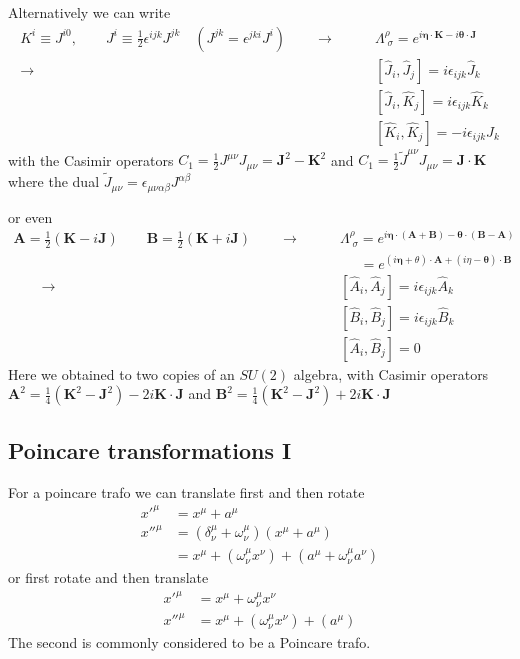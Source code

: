 \documentclass[10pt,a4paper]{report}
\theoremstyle{definition}
\begin{document}
Alternatively we can write
\begin{align}
K^i\equiv J^{i0},
\qquad 
J^i\equiv\frac{1}{2}\epsilon^{ijk}J^{jk}\quad(J^{jk}=\epsilon^{jki}J^i)\qquad\rightarrow\qquad&\Lambda^\rho_{\;\sigma}
=e^{i\mathbf{\eta}\cdot\mathbf{K}-i\mathbf{\theta}\cdot\mathbf{J}}\\
\rightarrow\qquad
&[\hat{J}_i,\hat{J}_j]=i\epsilon_{ijk}\hat{J}_k\\
&[\hat{J}_i,\hat{K}_j]=i\epsilon_{ijk}\hat{K}_k\\
&[\hat{K}_i,\hat{K}_j]=-i\epsilon_{ijk}\hat{J}_k
\end{align}
with the Casimir operators $C_1=\frac{1}{2}J^{\mu\nu}J_{\mu\nu}=\mathbf{J}^2-\mathbf{K}^2$ and $C_1=\frac{1}{2}\tilde{J}^{\mu\nu}J_{\mu\nu}=\mathbf{J}\cdot\mathbf{K}$
where the dual $\tilde{J}_{\mu\nu}=\epsilon_{\mu\nu\alpha\beta}J^{\alpha\beta}$



or even
\begin{align}
\mathbf{A}=\frac{1}{2}(\mathbf{K}-i\mathbf{J})
\qquad
\mathbf{B}=\frac{1}{2}(\mathbf{K}+i\mathbf{J})
\qquad\rightarrow\qquad
&\Lambda^\rho_{\;\sigma}
=e^{i\mathbf{\eta}\cdot(\mathbf{A+B})-\mathbf{\theta}\cdot(\mathbf{B}-\mathbf{A})}\\
&\;\;\;\;\;
=e^{(i\mathbf{\eta}+\theta)\cdot\mathbf{A}+(i\eta-\mathbf{\theta})\cdot\mathbf{B}}\\
\qquad\rightarrow\qquad
&[\hat{A}_i,\hat{A}_j]=i\epsilon_{ijk}\hat{A}_k\\
&[\hat{B}_i,\hat{B}_j]=i\epsilon_{ijk}\hat{B}_k\\
&[\hat{A}_i,\hat{B}_j]=0
\end{align}
Here we obtained to two copies of an $SU(2)$ algebra, with Casimir operators $\mathbf{A}^2=\frac{1}{4}(\mathbf{K}^2-\mathbf{J}^2)-2i\mathbf{K\cdot J}$ and $\mathbf{B}^2=\frac{1}{4}(\mathbf{K}^2-\mathbf{J}^2)+2i\mathbf{K\cdot J}$

\subsection{Poincare transformations I}
For a poincare trafo we can translate first and then rotate
\begin{align}
x'^\mu
&=x^\mu+a^\mu\\
x''^\mu
&=(\delta^\mu_\nu+\omega^\mu_\nu)(x^\mu+a^\mu)\\
&=x^\mu+(\omega^\mu_\nu x^\nu)+(a^\mu+\omega^\mu_\nu a^\nu)
\end{align} 
or first rotate and then translate
\begin{align}
x'^\mu
&=x^\mu+\omega^\mu_\nu x^\nu\\
x''^\mu
&=x^\mu+(\omega^\mu_\nu x^\nu)+(a^\mu)
\end{align}
The second is commonly considered to be a Poincare trafo.
\end{document}
